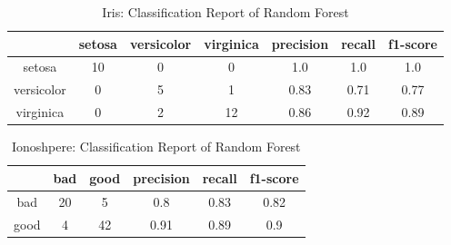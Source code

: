 \documentclass[english]{tktltiki2}
\theoremstyle{definition}
\theoremstyle{remark}
\begin{document}
\begin{table}[H]
	\caption{Iris: Classification Report of Random Forest}
	\label{tab:quantitative_experimentation_rf_iris_report}
	\begin{tabular}{@{}ccccccc@{}}
		\toprule
		& setosa & versicolor & virginica & precision & recall & f1-score \\ \hline
		
		\multicolumn{1}{|c|}{setosa} & \multicolumn{1}{c|}{10} & \multicolumn{1}{c|}{0} & \multicolumn{1}{c|}{0} & \multicolumn{1}{c|}{1.0} & \multicolumn{1}{c|}{1.0} & \multicolumn{1}{c|}{1.0} \\ \hline
		
		\multicolumn{1}{|c|}{versicolor} & \multicolumn{1}{c|}{0} & \multicolumn{1}{c|}{5} & \multicolumn{1}{c|}{1} & \multicolumn{1}{c|}{0.83} & \multicolumn{1}{c|}{0.71} & \multicolumn{1}{c|}{0.77} \\ \hline
		
		\multicolumn{1}{|c|}{virginica} & \multicolumn{1}{c|}{0} & \multicolumn{1}{c|}{2} & \multicolumn{1}{c|}{12} & \multicolumn{1}{c|}{0.86} & \multicolumn{1}{c|}{0.92} & \multicolumn{1}{c|}{0.89} \\ \hline

	\end{tabular}
\end{table}

\begin{table}[H]
	\begin{center}
		\caption{Ionoshpere: Classification Report of Random Forest}
		\label{tab:quantitative_experimentation_rf_iono_report}
		\begin{tabular}{@{}cccccc@{}}
			\toprule
			& bad & good & precision & recall & f1-score \\ \hline
			\multicolumn{1}{|c|}{bad} & \multicolumn{1}{c|}{20} & \multicolumn{1}{c|}{5} & \multicolumn{1}{c|}{0.8} & \multicolumn{1}{c|}{0.83} & \multicolumn{1}{c|}{0.82} \\ \hline
			\multicolumn{1}{|c|}{good} & \multicolumn{1}{c|}{4} & \multicolumn{1}{c|}{42} & \multicolumn{1}{c|}{0.91} & \multicolumn{1}{c|}{0.89} & \multicolumn{1}{c|}{0.9} \\ \hline
		\end{tabular}
	\end{center}
\end{table}
\end{document}
